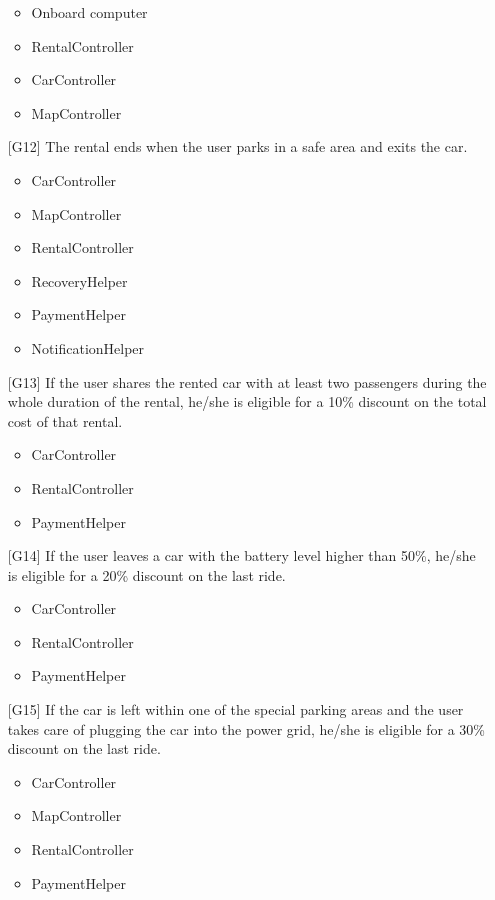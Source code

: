 \begin{itemize}
		\begin{itemize}
			\item Onboard computer
			\item RentalController
			\item CarController
			\item MapController
		\end{itemize}
	\item[{[G12]}] The rental ends when the user parks in a safe area and exits the car.
		\begin{itemize}
			\item CarController
			\item MapController
			\item RentalController
			\item RecoveryHelper
			\item PaymentHelper
			\item NotificationHelper
		\end{itemize}
	\item[{[G13]}] If the user shares the rented car with at least two passengers during the whole duration of the rental, he/she is eligible for a 10\% discount on the total cost of that rental.
		\begin{itemize}
			\item CarController
			\item RentalController
			\item PaymentHelper
		\end{itemize}
	\item[{[G14]}] If the user leaves a car with the battery level higher than 50\%, he/she is eligible for a 20\% discount on the last ride.
		\begin{itemize}
			\item CarController
			\item RentalController
			\item PaymentHelper
		\end{itemize}
	\item[{[G15]}] If the car is left within one of the special parking areas and the user takes care of plugging the car into the power grid, he/she is eligible for a 30\% discount on the last ride.
		\begin{itemize}
			\item CarController
			\item MapController
			\item RentalController
			\item PaymentHelper
		\end{itemize}

\end{itemize}
